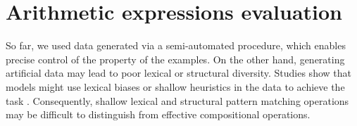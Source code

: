 


\section{Arithmetic expressions evaluation}



So far, we used data generated via a semi-automated procedure, which enables precise control of the property of the examples. On the other hand, generating artificial data may lead to poor lexical or structural diversity. Studies show that models might use lexical biases or shallow heuristics in the data to achieve the task \parencite{linzen_18}. Consequently, shallow lexical and structural pattern matching operations may be difficult to distinguish from effective compositional operations.

